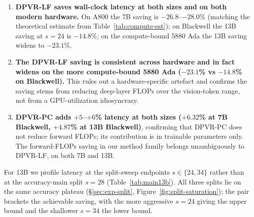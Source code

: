 \documentclass[a4paper,fleqn,review]{cas-sc}
\newcommand{\dpvrlf}{DPVR-LF}
\newcommand{\dpvrpc}{DPVR-PC}
\begin{document}
\begin{enumerate}
\item \textbf{\dpvrlf{} saves wall-clock latency at both sizes and on
both modern hardware.} On A800 the 7B saving is $-26.8$--$-28.0$\%
(matching the theoretical estimate from
Table~\ref{tab:compute-est}); on Blackwell the 13B saving at $s = 24$
is $-14.8$\%; on the compute-bound 5880 Ada the 13B saving widens to
$-23.1$\%.

\item \textbf{The \dpvrlf{} saving is consistent across hardware and
in fact widens on the more compute-bound 5880 Ada
($-23.1$\% vs $-14.8$\% on Blackwell).} This rules out a
hardware-specific artefact and confirms the saving stems from
reducing deep-layer FLOPs over the vision-token range, not from a
GPU-utilization idiosyncrasy.

\item \textbf{\dpvrpc{} adds $+5$--$+6$\% latency at both sizes
($+6.32$\% at 7B Blackwell, $+4.87$\% at 13B Blackwell)}, confirming
that \dpvrpc{} does not reduce forward FLOPs; its contribution is in
trainable parameters only. The forward-FLOPs saving in our method
family belongs unambiguously to \dpvrlf{}, on both 7B and 13B.
\end{enumerate}

For 13B we profile latency at the split-sweep endpoints
$s \in \{24, 34\}$ rather than at the accuracy-main split $s = 28$
(Table~\ref{tab:main13b}). All three splits lie on the same accuracy
plateau (\S\ref{sec:exp-split}, Figure~\ref{fig:split-saturation}); the
pair brackets the achievable saving, with the more aggressive $s = 24$
giving the upper bound and the shallower $s = 34$ the lower bound.
\end{document}
